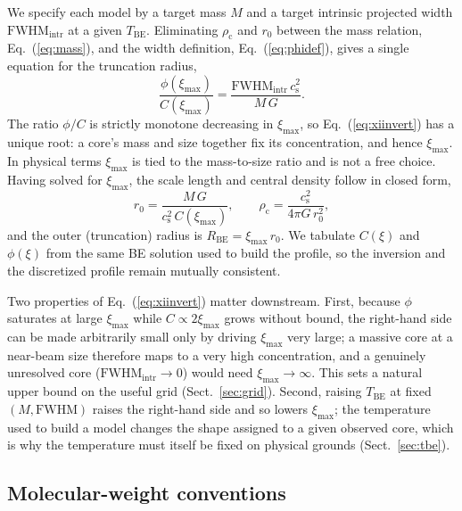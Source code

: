 \documentclass[11pt,a4paper]{article}
\newcommand{\rhoc}{\rho_{\mathrm{c}}}
\newcommand{\cs}{c_{\mathrm{s}}}
\newcommand{\rzero}{r_{0}}
\newcommand{\Rbe}{R_{\mathrm{BE}}}
\newcommand{\Tbe}{T_{\mathrm{BE}}}
\newcommand{\ximax}{\xi_{\mathrm{max}}}
\begin{document}
We specify each model by a target mass $M$ and a target intrinsic projected
width $\mathrm{FWHM}_{\mathrm{intr}}$ at a given $\Tbe$. Eliminating $\rhoc$ and
$\rzero$ between the mass relation, Eq.~(\ref{eq:mass}), and the width
definition, Eq.~(\ref{eq:phidef}), gives a single equation for the truncation
radius,
\begin{equation}
  \frac{\phi(\ximax)}{C(\ximax)}
  = \frac{\mathrm{FWHM}_{\mathrm{intr}}\,\cs^{2}}{M\,G} .
  \label{eq:xiinvert}
\end{equation}
The ratio $\phi/C$ is strictly monotone decreasing in $\ximax$, so
Eq.~(\ref{eq:xiinvert}) has a unique root: a core's mass and size together fix
its concentration, and hence $\ximax$. In physical terms $\ximax$ is tied to
the mass-to-size ratio and is not a free choice. Having solved for $\ximax$,
the scale length and central density follow in closed form,
\begin{equation}
  \rzero = \frac{M\,G}{\cs^{2}\,C(\ximax)},
  \qquad
  \rhoc = \frac{\cs^{2}}{4\pi G\,\rzero^{2}},
  \label{eq:rho_from_MFW}
\end{equation}
and the outer (truncation) radius is $\Rbe=\ximax\,\rzero$. We tabulate
$C(\xi)$ and $\phi(\xi)$ from the same BE solution used to build the profile,
so the inversion and the discretized profile remain mutually consistent.

Two properties of Eq.~(\ref{eq:xiinvert}) matter downstream. First, because
$\phi$ saturates at large $\ximax$ while $C \propto 2\ximax$ grows without
bound, the right-hand side can be made arbitrarily small only by driving
$\ximax$ very large; a massive core at a near-beam size therefore maps to a
very high concentration, and a genuinely unresolved core
($\mathrm{FWHM}_{\mathrm{intr}} \to 0$) would need $\ximax \to \infty$. This
sets a natural upper bound on the useful grid (Sect.~\ref{sec:grid}). Second,
raising $\Tbe$ at fixed $(M,\mathrm{FWHM})$ raises the right-hand side and so
lowers $\ximax$; the temperature used to build a model changes the shape
assigned to a given observed core, which is why the temperature must itself be
fixed on physical grounds (Sect.~\ref{sec:tbe}).

\subsection{Molecular-weight conventions}
\label{sec:mu}
\end{document}
